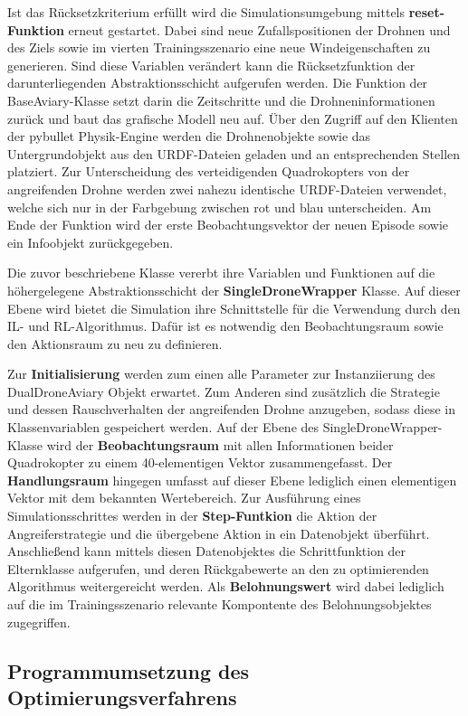 Ist das Rücksetzkriterium erfüllt wird die Simulationsumgebung mittels \textbf{reset-Funktion} erneut gestartet.
Dabei sind neue Zufallspositionen der Drohnen und des Ziels sowie im vierten Trainingsszenario eine neue Windeigenschaften zu generieren.
Sind diese Variablen verändert kann die Rücksetzfunktion der darunterliegenden Abstraktionsschicht aufgerufen werden.
Die Funktion der BaseAviary-Klasse setzt darin die Zeitschritte und die Drohneninformationen zurück und baut das grafische Modell neu auf.
Über den Zugriff auf den Klienten der pybullet Physik-Engine werden die Drohnenobjekte sowie das Untergrundobjekt aus den URDF-Dateien geladen und an entsprechenden Stellen platziert.
Zur Unterscheidung des verteidigenden Quadrokopters von der angreifenden Drohne werden zwei nahezu identische URDF-Dateien verwendet, welche sich nur in der Farbgebung zwischen rot und blau unterscheiden.
Am Ende der Funktion wird der erste Beobachtungsvektor der neuen Episode sowie ein Infoobjekt zurückgegeben.

Die zuvor beschriebene Klasse vererbt ihre Variablen und Funktionen auf die höhergelegene Abstraktionsschicht der \textbf{SingleDroneWrapper} Klasse.
Auf dieser Ebene wird bietet die Simulation ihre Schnittstelle für die Verwendung durch den IL- und RL-Algorithmus.
Dafür ist es notwendig den Beobachtungsraum sowie den Aktionsraum zu neu zu definieren.

Zur \textbf{Initialisierung} werden zum einen alle Parameter zur Instanziierung des DualDroneAviary Objekt erwartet.
Zum Anderen sind zusätzlich die Strategie und dessen Rauschverhalten der angreifenden Drohne anzugeben, sodass diese in Klassenvariablen gespeichert werden.
Auf der Ebene des SingleDroneWrapper-Klasse wird der \textbf{Beobachtungsraum} mit allen Informationen beider Quadrokopter zu einem 40-elementigen Vektor zusammengefasst.
Der \textbf{Handlungsraum} hingegen umfasst auf dieser Ebene lediglich einen elementigen Vektor mit dem bekannten Wertebereich.
Zur Ausführung eines Simulationsschrittes werden in der \textbf{Step-Funtkion} die Aktion der Angreiferstrategie und die übergebene Aktion in ein Datenobjekt überführt.
Anschließend kann mittels diesen Datenobjektes die Schrittfunktion der Elternklasse aufgerufen, und deren Rückgabewerte an den zu optimierenden Algorithmus weitergereicht werden.
Als \textbf{Belohnungswert} wird dabei lediglich auf die im Trainingsszenario relevante Kompontente des Belohnungsobjektes zugegriffen.

\subsection{Programmumsetzung des Optimierungsverfahrens}

